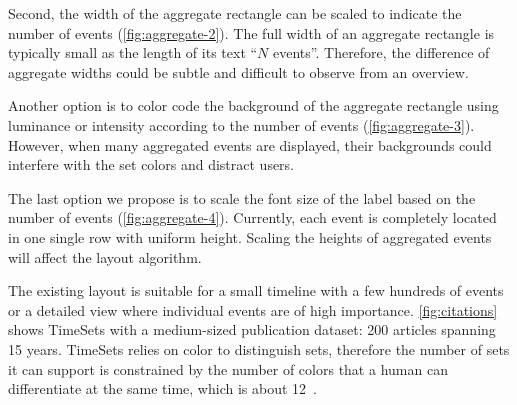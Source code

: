 Second, the width of the aggregate rectangle can be scaled to indicate the number of events (\autoref{fig:aggregate-2}). The full width of an aggregate rectangle is typically small as the length of its text ``$N$ events''. Therefore, the difference of aggregate widths could be subtle and difficult to observe from an overview.

Another option is to color code the background of the aggregate rectangle using luminance or intensity according to the number of events (\autoref{fig:aggregate-3}). However, when many aggregated events are displayed, their backgrounds could interfere with the set colors and distract users.

The last option we propose is to scale the font size of the label based on the number of events (\autoref{fig:aggregate-4}). Currently, each event is completely located in one single row with uniform height. Scaling the heights of aggregated events will affect the layout algorithm.

The existing layout is suitable for a small timeline with a few hundreds of events or a detailed view where individual events are of high importance. \autoref{fig:citations} shows TimeSets with a medium-sized publication dataset: 200 articles spanning 15 years. TimeSets relies on color to distinguish sets, therefore the number of sets it can support is constrained by the number of colors that a human can differentiate at the same time, which is about 12~\cite{Munzner2014}.